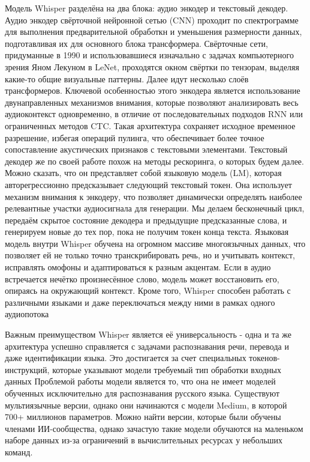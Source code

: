 Модель Whisper разделёна на два блока: аудио энкодер и текстовый декодер.
Аудио энкодер свёрточной нейронной сетью (CNN) проходит по спектрограмме для выполнения предварительной обработкн и уменьшения размерности данных, подготавливая их для основного блока трансформера.
Свёрточные сети, придуманные в 1990 и использовавшиеся изначально с задачах компьютерного зрения Яном Лекуном в LeNet\cite{LeCun1989}, проходятся окном свёртки по тензорам, выделяя какие-то общие визуальные паттерны.
Далее идут несколько слоёв трансформеров.
Ключевой особенностью этого энкодера является использование двунаправленных механизмов внимания, которые позволяют анализировать весь аудиоконтекст одновременно, в отличие от последовательных подходов RNN или ограниченных методов CTC.
Такая архитектура сохраняет исходное временное разрешение, избегая операций пулинга, что обеспечивает более точное сопоставление акустических признаков с текстовыми элементами.
Текстовый декодер же по своей работе  похож на методы рескоринга, о которых будем далее.
Можно сказать, что он представляет собой языковую модель (LM), которая авторегрессионно предсказывает следующий текстовый токен.
Она использует механизм внимания к энкодеру, что позволяет динамически определять наиболее релевантные участки аудиосигнала для генерации.
Мы делаем бесконечный цикл, передаём скрытое состояние декодера и предыдущие предсказанные слова, и генерируем новые до тех пор, пока не получим токен конца текста.
Языковая модель внутри Whisper обучена на огромном массиве многоязычных данных, что позволяет ей не только точно транскрибировать речь, но и учитывать контекст, исправлять омофоны и адаптироваться к разным акцентам.
Если в аудио встречается нечётко произнесённое слово, модель может восстановить его, опираясь на окружающий контекст.
Кроме того, Whisper способен работать с различными языками и даже переключаться между ними в рамках одного аудиопотока

Важным преимуществом Whisper является её универсальность - одна и та же архитектура успешно справляется с задачами распознавания речи, перевода и даже идентификации языка.
Это достигается за счет специальных токенов-инструкций, которые указывают модели требуемый тип обработки входных данных
Проблемой работы модели является то, что она не имеет моделей обученных исключительно для распознавания русского языка.
Существуют мультиязычные версии, однако они начинаются с модели Medium, в которой 700+ миллионов параметров.
Можно найти версии, которые были обучены членами ИИ-сообщества, однако зачастую такие модели обучаются на маленьком наборе данных из-за ограничений в вычислительных ресурсах у небольших команд.

